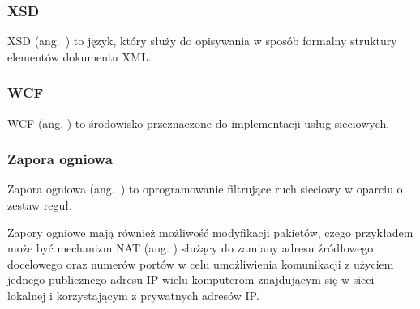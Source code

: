 \subsubsection*{XSD}

\label{def:background-XSD}XSD (ang.~)
to język, który służy do opisywania w sposób formalny struktury elementów
dokumentu XML.




\subsubsection*{WCF}

\label{def:background-WCF}WCF (ang, )
\cite{MSDN:WhatIsWindowsCommunicationFoundation} to środowisko przeznaczone
do implementacji usług sieciowych.




\subsubsection*{Zapora ogniowa}

\label{def:background-Firewall}Zapora ogniowa (ang.~)
to oprogramowanie filtrujące ruch sieciowy w oparciu o zestaw reguł.

Zapory ogniowe mają również możliwość modyfikacji pakietów, czego
przykładem może być mechanizm NAT (ang. )
\cite{rfc1631,rfc3022} służący do zamiany adresu źródłowego, docelowego
oraz numerów portów w celu umożliwienia komunikacji z użyciem jednego
publicznego adresu IP wielu komputerom znajdującym się w sieci lokalnej
i korzystającym z prywatnych adresów IP.


